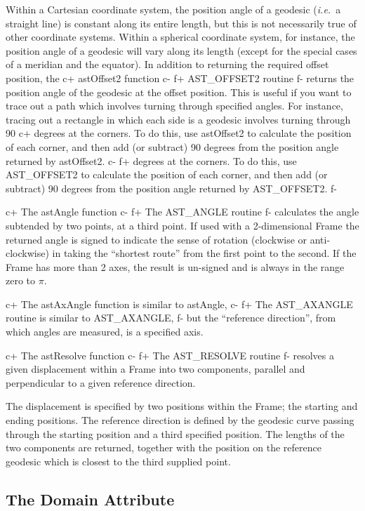 \documentclass[twoside,11pt]{starlink}
\begin{document}
Within a Cartesian coordinate system, the position angle of a geodesic
(\emph{i.e.}\ a straight line) is constant along its entire length, but
this is not necessarily true of other coordinate systems. Within a
spherical coordinate system, for instance, the position angle of a geodesic
will vary along its length (except for the special cases of a meridian and
the equator). In addition to returning the required offset position, the
c+
astOffset2 function
c-
f+
AST\_OFFSET2 routine
f-
returns the position angle of the geodesic at the
offset position. This is useful if you want to trace out a path which
involves turning through specified angles. For instance, tracing out a
rectangle in which each side is a geodesic involves turning through 90
c+
degrees at the corners. To do this, use astOffset2 to calculate the
position of each corner, and then add (or subtract) 90 degrees from the
position angle returned by astOffset2.
c-
f+
degrees at the corners. To do this, use AST\_OFFSET2 to calculate the
position of each corner, and then add (or subtract) 90 degrees from the
position angle returned by AST\_OFFSET2.
f-

c+
The astAngle function
c-
f+
The AST\_ANGLE routine
f-
calculates the angle subtended by two points, at a third point.
If used with a 2-dimensional Frame the returned angle
is signed to indicate the sense of rotation (clockwise or anti-clockwise)
in taking the ``shortest route'' from the first point to the second.
If the Frame has more than 2 axes, the result is un-signed and is always
in the range zero to $\pi$.

c+
The astAxAngle function is similar to astAngle,
c-
f+
The AST\_AXANGLE routine is similar to AST\_AXANGLE,
f-
but the ``reference direction'', from which angles are measured, is
a specified axis.

c+
The astResolve function
c-
f+
The AST\_RESOLVE routine
f-
resolves a given displacement within a Frame into two components, parallel and
perpendicular to a given reference direction.

The displacement is specified by two positions within the Frame; the
starting and ending positions. The reference direction is defined by the
geodesic curve passing through the starting position and a third specified
position. The lengths of the two components are returned, together with
the position on the reference geodesic which is closest to the third
supplied point.

\subsection{\label{ss:framedomains}The Domain Attribute}
\end{document}
